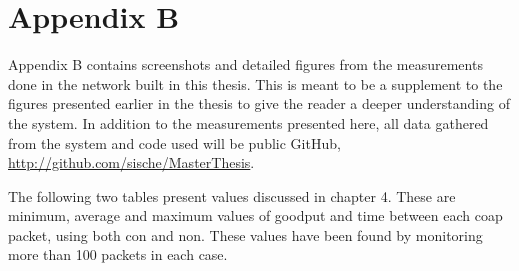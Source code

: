 \chapter{Appendix B}
\label{chp:appendixb}

Appendix B contains screenshots and detailed figures from the measurements done in the network built in this thesis. This is meant to be a supplement to the figures presented earlier in the thesis to give the reader a deeper understanding of the system. In addition to the measurements presented here, all data gathered from the system and code used will be public GitHub, \url{http://github.com/sische/MasterThesis}. 


The following two tables present values discussed in chapter 4. These are minimum, average and maximum values of goodput and time between each \gls{coap} packet, using both \gls{con} and \gls{non}. These values have been found by monitoring more than 100 packets in each case. 


